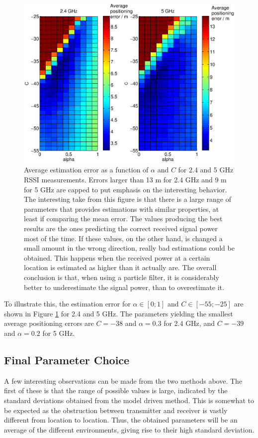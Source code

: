 \documentclass{LTHthesis}
\begin{document}
\begin{figure}[!hbt]

\includegraphics[width=1\textwidth ]{images/pure_rssi/err_vs_param}
\caption{Average estimation error as a function of $\alpha$ and $C$ for 2.4 and 5 GHz RSSI measurements. Errors larger than 13 m for 2.4 GHz and 9 m for 5 GHz are capped to put emphasis on the interesting behavior. The interesting take from this figure is that there is a large range of parameters that provides estimations with similar properties, at least if comparing the mean error. The values producing the best results are the ones predicting the correct received signal power most of the time. If these values, on the other hand, is changed a small amount in the wrong direction, really bad estimations could be obtained. This happens when the received power at a certain location is estimated as higher than it actually are. The overall conclusion is that, when using a particle filter, it is considerably better to underestimate the signal power, than to overestimate it.}\label{err_vs_param}
\end{figure}
%
To illustrate this, the estimation error for $\alpha \in [0;1]$ and $C \in [-55;-25]$ are shown in Figure \ref{err_vs_param} for 2.4 and 5 GHz. The parameters yielding the smallest average positioning errors are $C=-38$ and $\alpha = 0.3$ for 2.4 GHz, and $C=-39$ and $\alpha = 0.2$ for 5 GHz. 
%
\subsection{Final Parameter Choice}
%
A few interesting observations can be made from the two methods above. The first of these is that the range of possible values is large, indicated by the standard deviations obtained from the model driven method. This is somewhat to be expected as the obstruction between transmitter and receiver is vastly different from location to location. Thus, the obtained parameters will be an average of the different environments, giving rise to their high standard deviation. 
\end{document}
